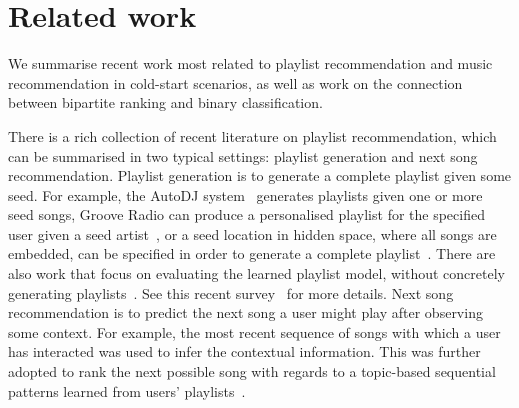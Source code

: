 \section{Related work}

We summarise recent work most related to playlist recommendation and music recommendation in cold-start 
scenarios,
as well as work on the connection between bipartite ranking and binary classification.

There is a rich collection of recent literature on playlist recommendation,
which can be summarised in two typical settings: 
playlist generation and next song recommendation. %
Playlist generation is to generate a complete playlist given some 
seed. %
For example, the AutoDJ system~\cite{platt2002learning} generates playlists given one or more seed songs,
Groove Radio can produce a personalised playlist for the specified user given a seed artist~\cite{ben2017groove},
or a seed location in hidden space, where all songs are embedded,
can be specified in order to generate a complete playlist~\cite{chen2012playlist}.
There are also work that focus on evaluating the learned playlist model,
without concretely generating playlists~\cite{mcfee2011natural,mcfee2012hypergraph}.
See this recent survey~\cite{bonnin2015automated} for more details.
%
Next song recommendation %
is to predict the next song a user might play after observing some context.
For example, the most recent sequence of songs with which a user has interacted was used to
infer the contextual information. %
This was further adopted to rank the next possible song
with regards to a topic-based sequential patterns learned from users' playlists~\cite{hariri2012context}.
